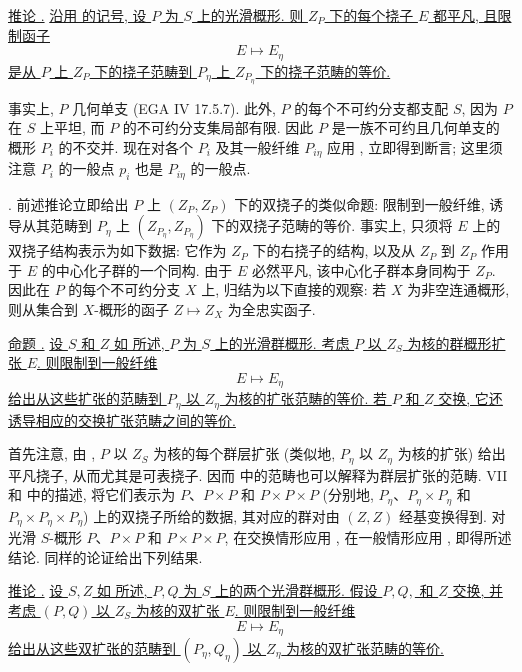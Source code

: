 \medskip
\noindent\underline{推论 .} \underline{沿用  的记号, 设 $P$ 为 $S$ 上的光滑概形. 则 $Z_P$ 下的每个挠子 $E$ 都平凡, 且限制函子}
\[
 E\longmapsto E_\eta
\]
\underline{是从 $P$ 上 $Z_P$ 下的挠子范畴到 $P_\eta$ 上 $Z_{P_\eta}$ 下的挠子范畴的等价.}

事实上, $P$ 几何单支 (EGA IV 17.5.7). 此外, $P$ 的每个不可约分支都支配 $S$, 因为 $P$ 在 $S$ 上平坦, 而 $P$ 的不可约分支集局部有限. 因此 $P$ 是一族不可约且几何单支的概形 $P_i$ 的不交并. 现在对各个 $P_i$ 及其一般纤维 $P_{i\eta}$ 应用 , 立即得到断言; 这里须注意 $P_i$ 的一般点 $p_i$ 也是 $P_{i\eta}$ 的一般点.

\medskip
\noindent {}. 前述推论立即给出 $P$ 上 $(Z_P,Z_P)$ 下的双挠子的类似命题: 限制到一般纤维, 诱导从其范畴到 $P_\eta$ 上 $(Z_{P_\eta},Z_{P_\eta})$ 下的双挠子范畴的等价. 事实上, 只须将 $E$ 上的双挠子结构表示为如下数据: 它作为 $Z_P$ 下的右挠子的结构, 以及从 $Z_P$ 到 $Z_P$ 作用于 $E$ 的中心化子群的一个同构. 由于 $E$ 必然平凡, 该中心化子群本身同构于 $Z_P$. 因此在 $P$ 的每个不可约分支 $X$ 上, 归结为以下直接的观察: 若 $X$ 为非空连通概形, 则从集合到 $X$-概形的函子 $Z\mapsto Z_X$ 为全忠实函子.

\medskip
\noindent\underline{命题 .} \underline{设 $S$ 和 $Z$ 如  所述, $P$ 为 $S$ 上的光滑群概形. 考虑 $P$ 以 $Z_S$ 为核的群概形扩张 $E$. 则限制到一般纤维}
\[
 E\longmapsto E_\eta
\]
\underline{给出从这些扩张的范畴到 $P_\eta$ 以 $Z_\eta$ 为核的扩张范畴的等价. 若 $P$ 和 $Z$ 交换, 它还诱导相应的交换扩张范畴之间的等价.}

首先注意, 由 , $P$ 以 $Z_S$ 为核的每个群层扩张 (类似地, $P_\eta$ 以 $Z_\eta$ 为核的扩张) 给出平凡挠子, 从而尤其是可表挠子. 因而  中的范畴也可以解释为群层扩张的范畴. VII  和  中的描述, 将它们表示为 $P$、$P\times P$ 和 $P\times P\times P$ (分别地, $P_\eta$、$P_\eta\times P_\eta$ 和 $P_\eta\times P_\eta\times P_\eta$) 上的双挠子所给的数据, 其对应的群对由 $(Z,Z)$ 经基变换得到. 对光滑 $S$-概形 $P$、$P\times P$ 和 $P\times P\times P$, 在交换情形应用 , 在一般情形应用 , 即得所述结论. 同样的论证给出下列结果.

\medskip
\noindent\underline{推论 .} \underline{设 $S,Z$ 如  所述, $P,Q$ 为 $S$ 上的两个光滑群概形. 假设 $P,Q,$ 和 $Z$ 交换, 并考虑 $(P,Q)$ 以 $Z_S$ 为核的双扩张 $E$. 则限制到一般纤维}
\[
 E\longmapsto E_\eta
\]
\underline{给出从这些双扩张的范畴到 $(P_\eta,Q_\eta)$ 以 $Z_\eta$ 为核的双扩张范畴的等价.}


